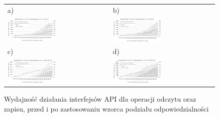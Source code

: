 \begin{figure}[htb]
  \centering
    \begin{tabular}{@{}ll@{}}
    a) & b) \\
    \includegraphics[width=0.49\textwidth]{rys05/dotnet-vs-cqrs.pdf} & \includegraphics[width=0.49\textwidth]{rys05/nodejs-vs-cqrs.pdf} \\
    c) & d) \\
    \includegraphics[width=0.49\textwidth]{rys05/dotnet-vs-cqrs-write.pdf} & \includegraphics[width=0.49\textwidth]{rys05/nodejs-vs-cqrs-write.pdf}
    \end{tabular}
  \caption{Wydajność działania interfejsów API dla operacji odczytu oraz zapisu, przed i po zastosowaniu wzorca podziału odpowiedzialności}
  \label{fig:3tier-vs-cqrs}
\end{figure}

